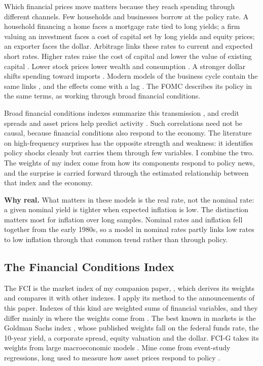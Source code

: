 \documentclass[11pt]{article}
\begin{document}
Which financial prices move matters because they reach spending through different channels. Few households and businesses borrow at the policy rate. A household financing a home faces a mortgage rate tied to long yields; a firm valuing an investment faces a cost of capital set by long yields and equity prices; an exporter faces the dollar. Arbitrage links these rates to current and expected short rates. Higher rates raise the cost of capital and lower the value of existing capital \citep{jorgenson1963,hall1967,tobin1969}. Lower stock prices lower wealth and consumption \citep{ando1963,friedman1957}. A stronger dollar shifts spending toward imports \citep{fleming1962,mundell1963}. Modern models of the business cycle contain the same links \citep{christiano2005,smets2007,gali2005,kaplan2018,auclert2019}, and the effects come with a lag \citep{friedman1961}. The FOMC describes its policy in the same terms, as working through broad financial conditions.

Broad financial conditions indexes summarize this transmission \citep{hatzius2010,brave2011,ajello2023}, and credit spreads and asset prices help predict activity \citep{gilchrist2012,stock2003}. Such correlations need not be causal, because financial conditions also respond to the economy. The literature on high-frequency surprises has the opposite strength and weakness: it identifies policy shocks cleanly but carries them through few variables. I combine the two. The weights of my index come from how its components respond to policy news, and the surprise is carried forward through the estimated relationship between that index and the economy.

\textbf{Why real.} What matters in these models is the real rate, not the nominal rate: a given nominal yield is tighter when expected inflation is low. The distinction matters most for inflation over long samples. Nominal rates and inflation fell together from the early 1980s, so a model in nominal rates partly links low rates to low inflation through that common trend rather than through policy.

\subsection{The Financial Conditions Index}\label{sec:measure}
The FCI is the market index of my companion paper, \citet{fcinote}, which derives its weights and compares it with other indexes. I apply its method to the announcements of this paper. Indexes of this kind are weighted sums of financial variables, and they differ mainly in where the weights come from \citep{hatzius2010}. The best known in markets is the Goldman Sachs index \citep{dudley2000,hatzius2018}, whose published weights fall on the federal funds rate, the 10-year yield, a corporate spread, equity valuation and the dollar. FCI-G takes its weights from large macroeconomic models \citep{ajello2023}. Mine come from event-study regressions, long used to measure how asset prices respond to policy \citep{kuttner2001,bernanke2005,hanson2015,nakamura2018}.
\end{document}
